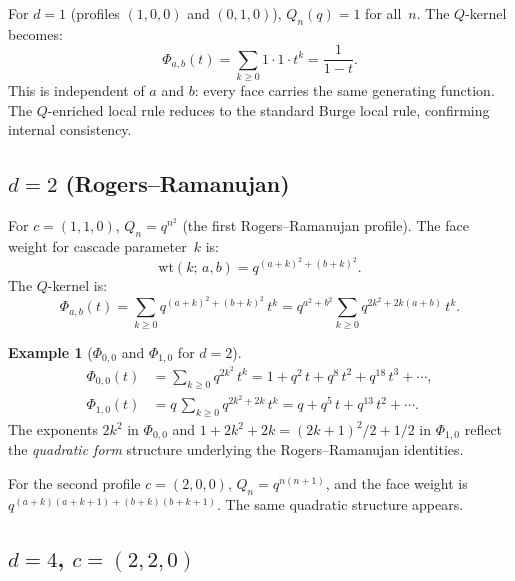 \documentclass[11pt]{article}
\theoremstyle{plain}
\theoremstyle{definition}
\newtheorem{example}[theorem]{Example}
\begin{document}
For $d = 1$ (profiles $(1,0,0)$ and $(0,1,0)$), $Q_n(q) = 1$
for all~$n$.  The $Q$-kernel becomes:
\begin{equation}\label{eq:Phi-d1}
  \Phi_{a,b}(t) = \sum_{k \geq 0} 1 \cdot 1 \cdot t^k
  = \frac{1}{1-t}.
\end{equation}
This is independent of $a$ and $b$: every face carries the same
generating function.  The $Q$-enriched local rule reduces to the
standard Burge local rule, confirming internal consistency.


\subsection{$d = 2$ (Rogers--Ramanujan)}

For $c = (1,1,0)$, $Q_n = q^{n^2}$ (the first Rogers--Ramanujan
profile).  The face weight for cascade parameter~$k$ is:
\begin{equation}\label{eq:face-weight-RR}
  \mathrm{wt}(k;\, a, b) = q^{(a+k)^2 + (b+k)^2}.
\end{equation}
The $Q$-kernel is:
\begin{equation}\label{eq:Phi-RR}
  \Phi_{a,b}(t)
  = \sum_{k \geq 0} q^{(a+k)^2 + (b+k)^2}\, t^k
  = q^{a^2 + b^2} \sum_{k \geq 0}
    q^{2k^2 + 2k(a+b)}\, t^k.
\end{equation}

\begin{example}[$\Phi_{0,0}$ and $\Phi_{1,0}$ for $d = 2$]
\label{ex:Phi-d2}
\begin{align}
  \Phi_{0,0}(t)
  &= \sum_{k \geq 0} q^{2k^2}\, t^k
  = 1 + q^2\, t + q^8\, t^2 + q^{18}\, t^3 + \cdots,
    \label{eq:Phi00-d2} \\
  \Phi_{1,0}(t)
  &= q\, \sum_{k \geq 0} q^{2k^2 + 2k}\, t^k
  = q + q^5\, t + q^{13}\, t^2 + \cdots.
    \label{eq:Phi10-d2}
\end{align}
The exponents $2k^2$ in $\Phi_{0,0}$ and $1 + 2k^2 + 2k
= (2k+1)^2/2 + 1/2$ in $\Phi_{1,0}$ reflect the
\emph{quadratic form} structure underlying the Rogers--Ramanujan
identities.
\end{example}

For the second profile $c = (2,0,0)$, $Q_n = q^{n(n+1)}$, and
the face weight is $q^{(a+k)(a+k+1) + (b+k)(b+k+1)}$.  The same
quadratic structure appears.

\subsection{$d = 4$, $c = (2,2,0)$}
\end{document}
